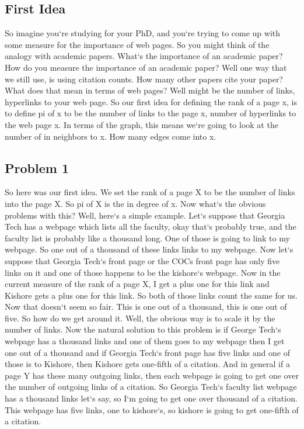 \subsection{First Idea}
So imagine you`re studying for your PhD, and you`re trying to come up with some measure for the importance of web pages.
So you might think of the analogy with academic papers.
What`s the importance of an academic paper? How do you measure the importance of an academic paper? Well one way that we still use, is using citation counts.
How many other papers cite your paper? What does that mean in terms of web pages? Well might be the number of links, hyperlinks to your web page.
So our first idea for defining the rank of a page x, is to define pi of x to be the number of links to the page x, number of hyperlinks to the web page x.
In terms of the graph, this means we`re going to look at the number of in neighbors to x.
How many edges come into x.

\subsection{Problem 1}
So here was our first idea.
We set the rank of a page X to be the number of links into the page X\@.
So pi of X is the in degree of x.
Now what`s the obvious problems with this? Well, here`s a simple example.
Let`s suppose that Georgia Tech has a webpage which lists all the faculty, okay that`s probably true, and the faculty list is probably like a thousand long.
One of those is going to link to my webpage.
So one out of a thousand of these links links to my webpage.
Now let`s suppose that Georgia Tech`s front page or the COCs front page has only five links on it and one of those happens to be the kishore`s webpage.
Now in the current measure of the rank of a page X, I get a plus one for this link and Kishore gets a plus one for this link.
So both of those links count the same for us.
Now that doesn`t seem so fair.
This is one out of a thousand, this is one out of five.
So how do we get around it.
Well, the obvious way is to scale it by the number of links.
Now the natural solution to this problem is if George Tech`s webpage has a thousand links and one of them goes to my webpage then I get one out of a thousand and if Georgia Tech`s front page has five links and one of those is to Kishore, then Kishore gets one-fifth of a citation.
And in general if a page Y has these many outgoing links, then each webpage is going to get one over the number of outgoing links of a citation.
So Georgia Tech`s faculty list webpage has a thousand links let`s say, so I`m going to get one over thousand of a citation.
This webpage has five links, one to kishore`s, so kishore is going to get one-fifth of a citation.

